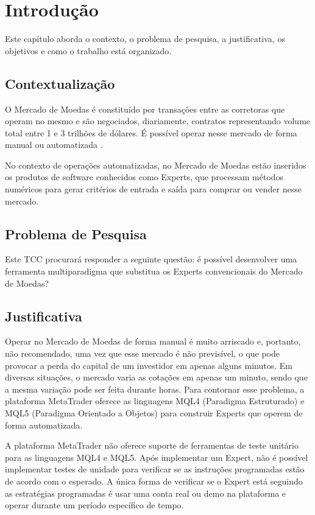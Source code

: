\chapter{Introdução}
Este capítulo aborda o contexto, o problema de pesquisa, a justificativa, os objetivos e como o trabalho está organizado.

\section{Contextualização}
O Mercado de Moedas é constituído por transações entre as corretoras que operam no mesmo e são negociados, diariamente, contratos representando volume total entre 1 e 3 trilhões de dólares. É possível operar nesse mercado de forma manual ou automatizada .

No contexto de operações automatizadas, no Mercado de Moedas estão inseridos os produtos de software conhecidos como Experts, que processam métodos numéricos para gerar critérios de entrada e saída para comprar ou vender nesse mercado.

\section{Problema de Pesquisa}
Este TCC procurará responder a seguinte questão: é possível desenvolver uma ferramenta multiparadigma que substitua os Experts convencionais do Mercado de Moedas? 

\section{Justificativa}

Operar no Mercado de Moedas de forma manual é muito arriscado e, portanto, não recomendado, uma vez que esse mercado é não previsível, o que pode provocar a perda do capital de um investidor em apenas alguns minutos. Em diversas situações, o mercado varia as cotações em apenas um minuto, sendo que a mesma variação pode ser feita durante horas. Para contornar esse problema, a plataforma MetaTrader oferece as linguagens MQL4 (Paradigma Estruturado) e MQL5 (Paradigma Orientado a Objetos) para construir Experts que operem de forma automatizada. 

A plataforma MetaTrader não oferece suporte de ferramentas de teste unitário para as linguagens MQL4 e MQL5. Após implementar um Expert, não é possível implementar testes de unidade para verificar se as instruções programadas estão de acordo com o esperado. A única forma de verificar se o Expert está seguindo as estratégias programadas é usar uma conta real ou demo na plataforma e operar durante um período específico de tempo.

